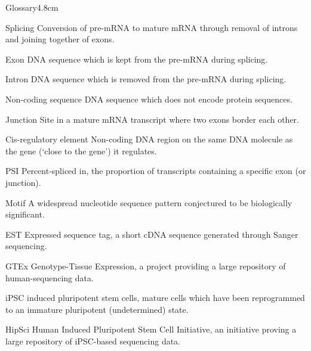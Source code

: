 \begin{mclistof}{Glossary}{4.8cm}
\item[Splicing] Conversion of pre-mRNA to mature mRNA through removal of introns and joining together of exons.
\item[Exon] DNA sequence which is kept from the pre-mRNA during splicing.
\item[Intron] DNA sequence which is removed from the pre-mRNA during splicing.
\item[Non-coding sequence] DNA sequence which does not encode protein sequences. 
\item[Junction] Site in a mature mRNA transcript where two exons border each other.
\item[Cis-regulatory element] Non-coding DNA region on the same DNA molecule as the gene (`close to the gene') it regulates.
\item[PSI] Percent-spliced in, the proportion of transcripts containing a specific exon (or junction).
\item[Motif] A widespread nucleotide sequence pattern conjectured to be biologically significant.
\item[EST] Expressed sequence tag, a short cDNA sequence generated through Sanger sequencing.
\item[GTEx] Genotype-Tissue Expression, a project providing a large repository of human-sequencing data.

\item[iPSC] induced pluripotent stem cells, mature cells which have been reprogrammed to an immature pluripotent (undetermined) state.
\item[HipSci] Human Induced Pluripotent Stem Cell Initiative, an initiative proving a large repository of iPSC-based sequencing data.


\end{mclistof}
